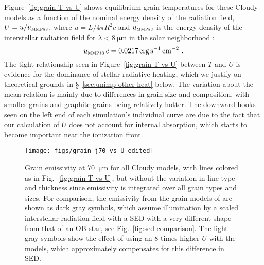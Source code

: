 \documentclass[useAMS, usenatbib, a4paper]{mnras}
\newcommand\mmp{\ensuremath{_{\text{\tiny MMP83}}}}
\begin{document}
Figure~\ref{fig:grain-T-vs-U} shows equilibrium grain temperatures for
these Cloudy models as a function of the nominal energy density of the
radiation field, \(U = u / u\mmp \), where \(u = L / 4 \pi R^2 c\) and
\(u\mmp\) is the energy density of the interstellar radiation field
for \(\lambda < \SI{8}{\um}\) in the solar neighborhood
\citep{Mathis:1983a}:
\begin{equation}
  \label{eq:u-mmp83}
  u\mmp\,c = \SI{0.0217}{erg.s^{-1}.cm^{-2}} \ .
\end{equation}
The tight relationship seen in Figure~\ref{fig:grain-T-vs-U} between
\(T\) and \(U\) is evidence for the dominance of stellar radiative
heating, which we justify on theoretical grounds in
\S~\ref{sec:unimp-other-heat} below.  The variation about the mean
relation is mainly due to differences in grain size and composition,
with smaller grains and graphite grains being relatively hotter.  The
downward hooks seen on the left end of each simulation's individual
curve are due to the fact that our calculation of \(U\) does not
account for internal absorption, which starts to become important near
the ionization front.

\begin{figure}
  \centering
  \texttt{[image: figs/grain-j70-vs-U-edited]}
  \caption{Grain emissivity at \SI{70}{\um} for all Cloudy models,
    with lines colored as in Fig.~\ref{fig:grain-T-vs-U}, but without
    the variation in line type and thickness since emissivity is
    integrated over all grain types and sizes.  For comparison, the
    emissivity from the grain models of \citet{Draine:2007a} are shown
    as dark gray symbols, which assume illumination by a scaled
    interstellar radiation field with a SED with a very different
    shape from that of an OB star, see Fig.~\ref{fig:sed-comparison}.
    The light gray symbols show the effect of using an 8 times higher
    \(U\) with the \citeauthor{Draine:2007a} models, which
    approximately compensates for this difference in SED.  }
  \label{fig:grain-j70}
\end{figure}
\end{document}
